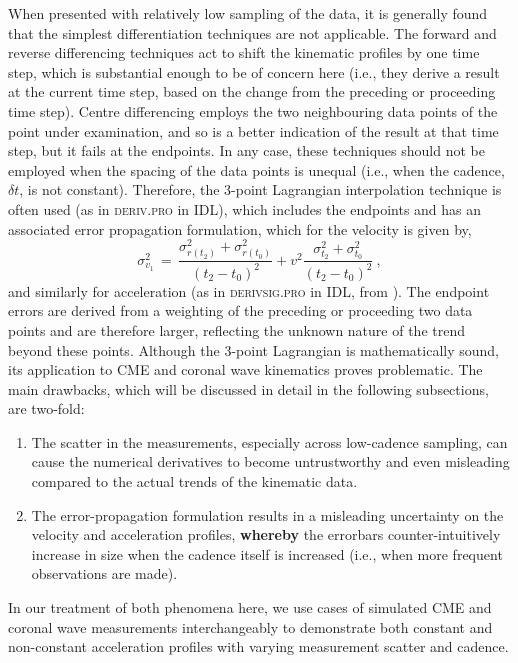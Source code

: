 \documentclass[structabstract]{aa}
\begin{document}
When presented with relatively low sampling of the data, it is generally found that the simplest differentiation techniques are not applicable. The forward and reverse differencing techniques act to shift the kinematic profiles by one time step, which is substantial enough to be of concern here (i.e., they derive a result at the current time step, based on the change from the preceding or proceeding time step). Centre differencing employs the two neighbouring data points of the point under examination, and so is a better indication of the result at that time step, but it fails at the endpoints. In any case, these techniques should not be employed when the spacing of the data points is unequal (i.e., when the cadence, $\delta t$, is not constant). Therefore, the 3-point Lagrangian interpolation technique is often used (as in \textsc{deriv.pro} in IDL), which includes the endpoints and has an associated error propagation formulation, which for the velocity is given by,
\begin{equation}
\sigma_{v_1}^2 \,=\, \frac{\sigma_{r(t_2)}^2+\sigma_{r(t_0)}^2}{(t_2-t_0)^2} + v^2 \frac{\sigma_{t_2}^2+\sigma_{t_0}^2}{(t_2-t_0)^2}\ ,
\label{vel_err}
\end{equation}
and similarly for acceleration (as in \textsc{derivsig.pro} in IDL, from \citealt{2003drea.book.....B}). The endpoint errors are derived from a weighting of the preceding or proceeding two data points and are therefore larger, reflecting the unknown nature of the trend beyond these points.
Although the 3-point Lagrangian is mathematically sound, its application to CME and coronal wave kinematics proves problematic. The main drawbacks, which will be discussed in detail in the following subsections, are two-fold:
\begin{enumerate}
\item The scatter in the measurements, especially across low-cadence sampling, can cause the numerical derivatives to become untrustworthy and even misleading compared to the actual trends of the kinematic data.
\item The error-propagation formulation results in a misleading uncertainty on the velocity and acceleration profiles, {\bf whereby} the errorbars counter-intuitively increase in size when the cadence itself is increased (i.e., when more frequent observations are made).
\end{enumerate}
In our treatment of both phenomena here, we use cases of simulated CME and coronal wave measurements interchangeably to demonstrate both constant and non-constant acceleration profiles with varying measurement scatter and cadence.
\end{document}
